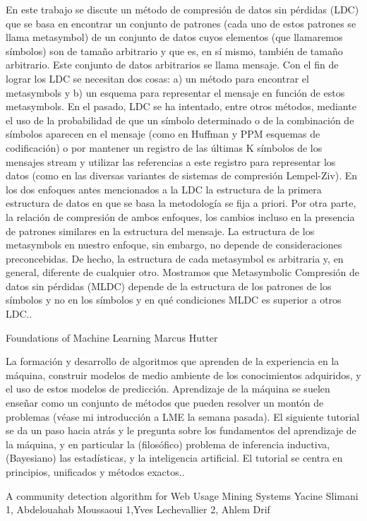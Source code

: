 En este trabajo se discute un método de compresión de datos sin pérdidas (LDC) que se basa en encontrar un conjunto de patrones (cada uno de estos patrones se llama metasymbol) de un conjunto de datos cuyos elementos (que llamaremos símbolos) son de tamaño arbitrario y que es, en sí mismo, también de tamaño arbitrario. Este conjunto de datos arbitrarios se llama  mensaje. Con el fin de lograr los LDC se necesitan dos cosas: a) un método para encontrar el metasymbols y b) un esquema para representar el mensaje en función de estos metasymbols. En el pasado,  LDC se ha intentado, entre otros métodos, mediante el uso de la probabilidad de que un símbolo determinado o de la combinación de símbolos aparecen en el mensaje (como en Huffman y PPM esquemas de codificación) o por mantener un registro de las últimas K símbolos de los mensajes stream y utilizar las referencias a este registro para representar los datos (como en las diversas variantes de sistemas de compresión Lempel-Ziv).  En los dos enfoques antes mencionados a la LDC la estructura de la primera estructura de datos en que se basa la metodología se fija a priori. Por otra parte, la relación de compresión de ambos enfoques, los cambios incluso en la presencia de patrones similares en la estructura del mensaje. La estructura de los metasymbols en nuestro enfoque, sin embargo, no depende de consideraciones preconcebidas. De hecho, la estructura de cada metasymbol es arbitraria y, en general, diferente de cualquier otro. Mostramos que Metasymbolic Compresión de datos sin pérdidas (MLDC) depende de la estructura de los patrones de los símbolos y no en los símbolos y en qué condiciones MLDC es superior a otros LDC..


Foundations of Machine Learning
Marcus Hutter

La formación y desarrollo de algoritmos que aprenden de la experiencia en la máquina, construir modelos de medio ambiente de los conocimientos adquiridos, y el uso de estos modelos de predicción. Aprendizaje de la máquina se suelen enseñar como un conjunto de métodos que pueden resolver un montón de problemas (véase mi introducción a LME la semana pasada).  El siguiente tutorial se da un paso hacia atrás y le pregunta sobre los fundamentos del aprendizaje de la máquina, y en particular la (filosófico) problema de inferencia inductiva, (Bayesiano) las estadísticas, y la inteligencia artificial. El tutorial se centra en principios, unificados  y métodos exactos..


A community detection algorithm for Web Usage Mining Systems
Yacine Slimani 1, Abdelouahab Moussaoui 1,Yves Lechevallier 2, Ahlem Drif 

